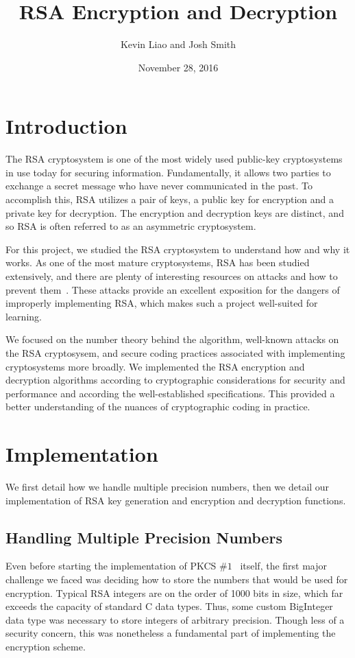 \documentclass[letterpaper]{article}
\title{RSA Encryption and Decryption}
\author{Kevin Liao and Josh Smith}
\date{November 28, 2016}
\begin{document}
\maketitle

\section{Introduction}
The RSA cryptosystem is one of the most widely used public-key cryptosystems in use today for securing information. Fundamentally, it allows two parties to exchange a secret message who have never communicated in the past. To accomplish this, RSA utilizes a pair of keys, a public key for encryption and a private key for decryption. The encryption and decryption keys are distinct, and so RSA is often referred to as an asymmetric cryptosystem.

For this project, we studied the RSA cryptosystem to understand how and why it works. As one of the most mature cryptosystems, RSA has been studied extensively, and there are plenty of interesting resources on attacks and how to prevent them~\cite{boneh1999twenty}. These attacks provide an excellent exposition for the dangers of improperly implementing RSA, which makes such a project well-suited for learning.

We focused on the number theory behind the algorithm, well-known attacks on the RSA cryptosysem, and secure coding practices associated with implementing cryptosystems more broadly. We implemented the RSA encryption and decryption algorithms according to cryptographic considerations for security and performance and according the well-established specifications. This provided a better understanding of the nuances of cryptographic coding in practice.

\section{Implementation}

We first detail how we handle multiple precision numbers, then we detail our implementation of RSA key generation and encryption and decryption functions.

\subsection{Handling Multiple Precision Numbers}

Even before starting the implementation of PKCS $\#1$~\cite{rsa2012pkcs} itself, the first major challenge we faced was deciding how to store the numbers that would be used for encryption. Typical RSA integers are on the order of 1000 bits in size, which far exceeds the capacity of standard C data types. Thus, some custom BigInteger data type was necessary to store integers of arbitrary precision. Though less of a security concern, this was nonetheless a fundamental part of implementing the encryption scheme.
\end{document}
